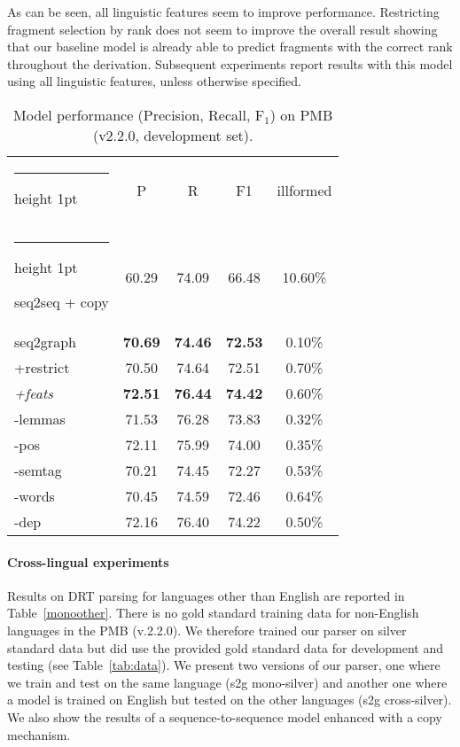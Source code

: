 \documentclass[11pt,a4paper]{article}
\makeatletter
\theoremstyle{plain}
\newcommand{\thickhline}{\noalign {\ifnum 0=`}\fi \hrule height 1pt
    \futurelet \reserved@a \@xhline
}
\makeatother
\begin{document}
As can be seen, all linguistic features seem to improve
performance. Restricting fragment selection by rank does not seem to improve the overall result showing that our baseline model is already able to predict fragments with the correct rank throughout the derivation. Subsequent experiments report results with this model using all linguistic features, unless otherwise specified.

\begin{table}[t]
\begin{center}
\begin{small}
\begin{tabular}{@{~}l@{~~~}c@{~~}c@{~~}c@{~~}c@{~~}} \thickhline
& P & R & F1 & illformed\\ 
\thickhline
seq2seq + copy & 60.29 & 74.09 & 66.48 & 10.60\%\\
\hline
seq2graph & \textbf{70.69} & \textbf{74.46} & \textbf{72.53} & 0.10\%\\
+restrict & 70.50 & 74.64 & 72.51 & 0.70\%\\
\hline
\textit{+feats} & \textbf{72.51} & \textbf{76.44} & \textbf{74.42} & 0.60\%\\
-lemmas & 71.53 & 76.28 & 73.83 & 0.32\%\\
-pos & 72.11 & 75.99 & 74.00 & 0.35\%\\
-semtag & 70.21 & 74.45 & 72.27 & 0.53\%\\
-words & 70.45 & 74.59 & 72.46 & 0.64\%\\
-dep & 72.16 & 76.40 & 74.22 & 0.50\%\\\hline
\end{tabular}
\end{small}
\caption{Model performance (Precision, Recall, F$_1$) on PMB
  (v2.2.0, development set).}
\label{Baseline}
\end{center}
\end{table}

\paragraph{Cross-lingual experiments} Results on DRT parsing
for languages other than English are reported in
Table~\ref{monoother}.  There is no gold standard training data for
non-English languages in the PMB (v.2.2.0). We therefore trained our
parser on silver standard data but did use the provided gold standard
data for development and testing (see Table~\ref{tab:data}).  We
present two versions of our parser, one where we train and test on the
same language (s2g mono-silver) and another one where a model is
trained on English but tested on the other languages (s2g
cross-silver). We also show the results of a sequence-to-sequence
model enhanced with a copy mechanism.
\end{document}
